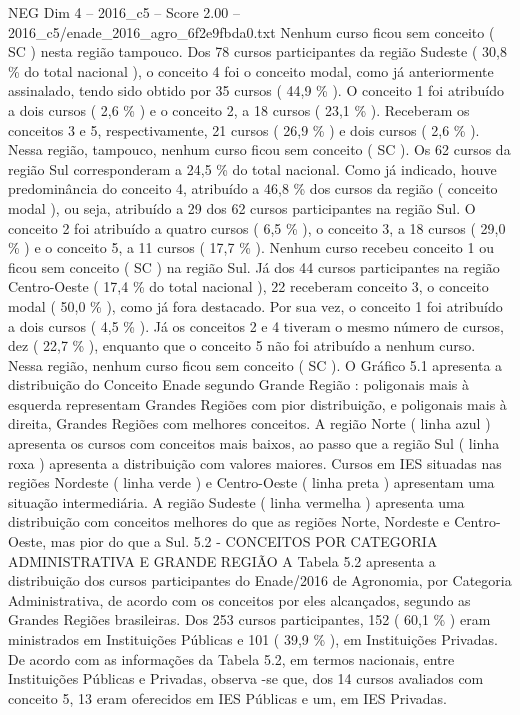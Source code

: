 \begin{textsample}{NEG Dim 4 – 2016\_c5 – Score 2.00 – 2016\_c5/enade\_2016\_agro\_6f2e9fbda0.txt}
Nenhum curso ficou sem conceito ( SC ) nesta região tampouco.
Dos 78 cursos participantes da região Sudeste ( 30,8 \% do total nacional ), o conceito 4 foi o conceito modal, como já anteriormente assinalado, tendo sido obtido por 35 cursos ( 44,9 \% ).
O conceito 1 foi atribuído a dois cursos ( 2,6 \% ) e o conceito 2, a 18 cursos ( 23,1 \% ).
Receberam os conceitos 3 e 5, respectivamente, 21 cursos ( 26,9 \% ) e dois cursos ( 2,6 \% ).
Nessa região, tampouco, nenhum curso ficou sem conceito ( SC ).
Os 62 cursos da região Sul corresponderam a 24,5 \% do total nacional.
Como já indicado, houve predominância do conceito 4, atribuído a 46,8 \% dos cursos da região ( conceito modal ), ou seja, atribuído a 29 dos 62 cursos participantes na região Sul.
O conceito 2 foi atribuído a quatro cursos ( 6,5 \% ), o conceito 3, a 18 cursos ( 29,0 \% ) e o conceito 5, a 11 cursos ( 17,7 \% ).
Nenhum curso recebeu conceito 1 ou ficou sem conceito ( SC ) na região Sul.
Já dos 44 cursos participantes na região Centro-Oeste ( 17,4 \% do total nacional ), 22 receberam conceito 3, o conceito modal ( 50,0 \% ), como já fora destacado.
Por sua vez, o conceito 1 foi atribuído a dois cursos ( 4,5 \% ).
Já os conceitos 2 e 4 tiveram o mesmo número de cursos, dez ( 22,7 \% ), enquanto que o conceito 5 não foi atribuído a nenhum curso.
Nessa região, nenhum curso ficou sem conceito ( SC ).
O Gráfico 5.1 apresenta a distribuição do Conceito Enade segundo Grande Região : poligonais mais à esquerda representam Grandes Regiões com pior distribuição, e poligonais mais à direita, Grandes Regiões com melhores conceitos.
A região Norte ( linha azul ) apresenta os cursos com conceitos mais baixos, ao passo que a região Sul ( linha roxa ) apresenta a distribuição com valores maiores.
Cursos em IES situadas nas regiões Nordeste ( linha verde ) e Centro-Oeste ( linha preta ) apresentam uma situação intermediária.
A região Sudeste ( linha vermelha ) apresenta uma distribuição com conceitos melhores do que as regiões Norte, Nordeste e Centro-Oeste, mas pior do que a Sul. 5.2 - CONCEITOS POR CATEGORIA ADMINISTRATIVA E GRANDE REGIÃO A Tabela 5.2 apresenta a distribuição dos cursos participantes do Enade/2016 de Agronomia, por Categoria Administrativa, de acordo com os conceitos por eles alcançados, segundo as Grandes Regiões brasileiras.
Dos 253 cursos participantes, 152 ( 60,1 \% ) eram ministrados em Instituições Públicas e 101 ( 39,9 \% ), em Instituições Privadas.
De acordo com as informações da Tabela 5.2, em termos nacionais, entre Instituições Públicas e Privadas, observa -se que, dos 14 cursos avaliados com conceito 5, 13 eram oferecidos em IES Públicas e um, em IES Privadas.

\end{textsample}
